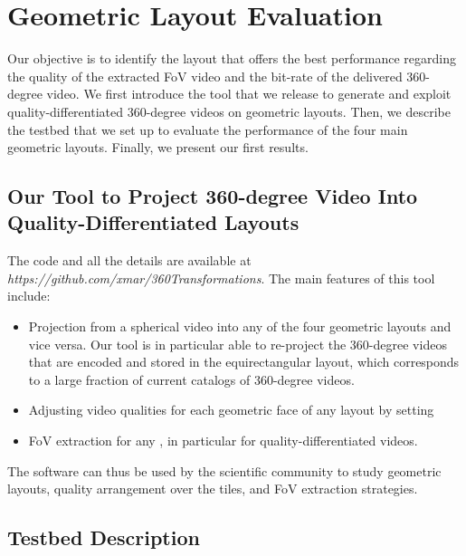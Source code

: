 \section{Geometric Layout Evaluation}

Our objective is to identify the layout that offers the best
performance regarding the quality of the extracted \ac{FoV} video and
the bit-rate of the delivered 360-degree video. We first introduce the
tool that we release to generate and exploit quality-differentiated
360-degree videos on geometric layouts. Then, we describe the testbed
that we set up to evaluate the performance of the four main geometric
layouts. Finally, we present our first results.

\subsection{Our Tool to Project 360-degree Video Into
Quality-Differentiated Layouts}

The code and all the details are available at
\textit{https://github.com/xmar/360Transformations}. The main features
of this tool include:
\begin{itemize}
   \item Projection from a spherical video into any of the four
   geometric layouts and vice versa. Our tool is in particular able to
   re-project the 360-degree videos that are encoded and stored in the
   equirectangular layout, which corresponds to a large fraction of
   current catalogs of 360-degree videos.

   \item Adjusting video qualities for each geometric face of any
   layout by setting 

   \item \ac{FoV} extraction for any , in
   particular for quality-differentiated videos.
\end{itemize}

The software can thus be used by the scientific community to study
geometric layouts, quality arrangement over the tiles, and \ac{FoV}
extraction strategies.

\subsection{Testbed Description}

